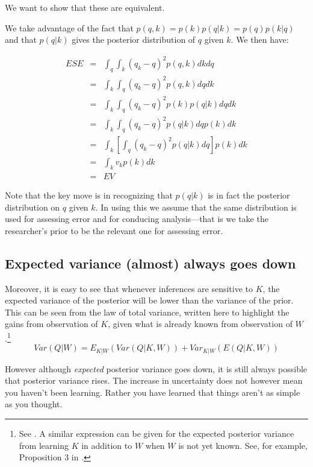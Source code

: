 \documentclass[
  12pt,
]{book}
\begin{document}
We want to show that these are equivalent.

We take advantage of the fact that \(p(q,k) = p(k)p(q|k) = p(q)p(k|q)\) and that \(p(q|k)\) gives the posterior distribution of \(q\) given \(k\). We then have:

\[
\begin{eqnarray}
ESE &=& \int_q\int_k \left({q}_k-q\right)^2p(q,k)dkdq \\
    &=& \int_k\int_q \left({q}_k-q\right)^2p(q,k)dq dk \\
    &=& \int_k\int_q \left({q}_k-q\right)^2p(k)p(q|k)dq dk \\
    &=& \int_k\int_q \left({q}_k-q\right)^2p(q|k)dq p(k)dk \\
    &=& \int_k\left[\int_q \left({q}_k-q\right)^2p(q|k)dq\right]p(k)dk \\
    &=& \int_k v_k p(k)dk \\
    & = & EV
\end{eqnarray}
\]

Note that the key move is in recognizing that \(p(q |k)\) is in fact the posterior distribution on \(q\) given \(k\). In using this we assume that the same distribution is used for assessing error and for conducing analysis---that is we take the researcher's prior to be the relevant one for assessing error.

\hypertarget{expected-variance-almost-always-goes-down}{%
\subsection{Expected variance (almost) always goes down}\label{expected-variance-almost-always-goes-down}}

Moreover, it is easy to see that whenever inferences are sensitive to \(K\), the expected variance of the posterior will be lower than the variance of the prior. This can be seen from the law of total variance, written here to highlight the gains from observation of \(K\), given what is already known from observation of \(W\).\footnote{See \citet{raiffa1961applied}. A similar expression can be given for the expected posterior variance from learning \(K\) in addition to \(W\) when \(W\) is not yet known. See, for example, Proposition 3 in \citet{geweke2014analysis}.}\\
\[Var(Q|W) = E_{K|W}(Var(Q|K,W)) +Var_{K|W}(E(Q|K,W))\]

However although \emph{expected} posterior variance goes down, it is still always possible that posterior variance rises. The increase in uncertainty does not however mean you haven't been learning. Rather you have learned that things aren't as simple as you thought.
\end{document}
